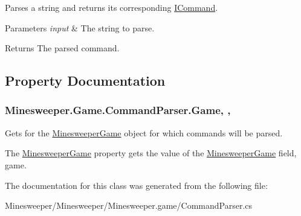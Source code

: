 Parses a string and returns its corresponding \hyperlink{interface_minesweeper_1_1_game_1_1_i_command}{I\+Command}. 


\begin{DoxyParams}{Parameters}
{\em input} & The string to parse.\\
\hline
\end{DoxyParams}
\begin{DoxyReturn}{Returns}
The parsed command.
\end{DoxyReturn}


\subsection{Property Documentation}
\hypertarget{class_minesweeper_1_1_game_1_1_command_parser_ad8ac44210715f94c2d35e94b7ca48a3a}{
\subsubsection[{Game}]{ Minesweeper.\+Game.\+Command\+Parser.\+Game\hspace{0.3cm}{\ttfamily [get]}, {\ttfamily [set]}, {\ttfamily [protected]}}}\label{class_minesweeper_1_1_game_1_1_command_parser_ad8ac44210715f94c2d35e94b7ca48a3a}


Gets for the \hyperlink{class_minesweeper_1_1_game_1_1_minesweeper_game}{Minesweeper\+Game} object for which commands will be parsed. 

The \hyperlink{class_minesweeper_1_1_game_1_1_minesweeper_game}{Minesweeper\+Game} property gets the value of the \hyperlink{class_minesweeper_1_1_game_1_1_minesweeper_game}{Minesweeper\+Game} field, game.

The documentation for this class was generated from the following file\+:\begin{DoxyCompactItemize}
\item 
Minesweeper/\+Minesweeper/\+Minesweeper.\+game/Command\+Parser.\+cs\end{DoxyCompactItemize}
